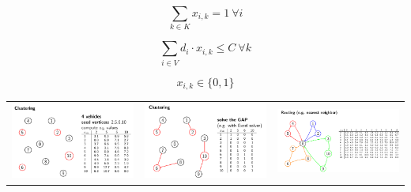 \documentclass[]{article}
\begin{document}
\begin{equation} \label{GAP2}
 \sum_{k \in K} x_{i,k} = 1 \ \forall i
\end{equation}

\begin{equation} \label{GAP3}
\sum_{i \in V} d_{i}  \cdot x_{i,k} \leq C \ \forall k
\end{equation}

\begin{equation} \label{GAP3}
x_{i,k} \in \{0,1\}
\end{equation}


\begin{table}
	\begin{tabular}{c|c|c}
		\includegraphics[scale = 0.13]{images/CL-FJ-a} & 
		\includegraphics[scale = 0.13]{images/FJ_CL.png}  & 
		\includegraphics[scale = 0.13]{images/FJ_R.png}\\	

\end{tabular}
\end{table}
\end{document}

